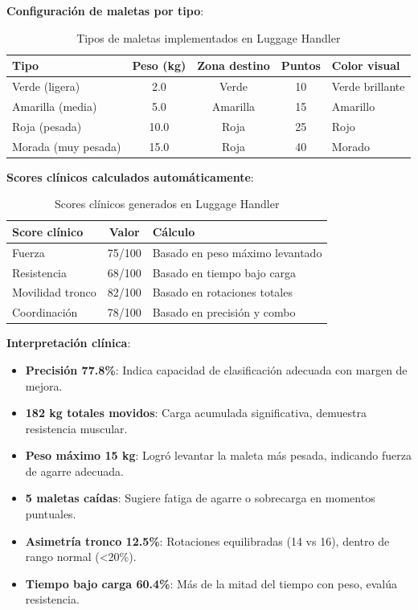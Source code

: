 \textbf{Configuración de maletas por tipo}:

\begin{table}[h]
\centering
\begin{tabular}{|l|c|c|c|l|}
\hline
\textbf{Tipo} & \textbf{Peso (kg)} & \textbf{Zona destino} & \textbf{Puntos} & \textbf{Color visual} \\ \hline
Verde (ligera) & 2.0 & Verde & 10 & Verde brillante \\ \hline
Amarilla (media) & 5.0 & Amarilla & 15 & Amarillo \\ \hline
Roja (pesada) & 10.0 & Roja & 25 & Rojo \\ \hline
Morada (muy pesada) & 15.0 & Roja & 40 & Morado \\ \hline
\end{tabular}
\caption{Tipos de maletas implementados en Luggage Handler}
\label{tab:luggage-types}
\end{table}

\textbf{Scores clínicos calculados automáticamente}:

\begin{table}[h]
\centering
\begin{tabular}{|l|c|l|}
\hline
\textbf{Score clínico} & \textbf{Valor} & \textbf{Cálculo} \\ \hline
Fuerza & 75/100 & Basado en peso máximo levantado \\ \hline
Resistencia & 68/100 & Basado en tiempo bajo carga \\ \hline
Movilidad tronco & 82/100 & Basado en rotaciones totales \\ \hline
Coordinación & 78/100 & Basado en precisión y combo \\ \hline
\end{tabular}
\caption{Scores clínicos generados en Luggage Handler}
\label{tab:luggage-clinical-scores}
\end{table}

\textbf{Interpretación clínica}:
\begin{itemize}
    \item \textbf{Precisión 77.8\%}: Indica capacidad de clasificación adecuada con margen de mejora.
    \item \textbf{182 kg totales movidos}: Carga acumulada significativa, demuestra resistencia muscular.
    \item \textbf{Peso máximo 15 kg}: Logró levantar la maleta más pesada, indicando fuerza de agarre adecuada.
    \item \textbf{5 maletas caídas}: Sugiere fatiga de agarre o sobrecarga en momentos puntuales.
    \item \textbf{Asimetría tronco 12.5\%}: Rotaciones equilibradas (14 vs 16), dentro de rango normal (<20\%).
    \item \textbf{Tiempo bajo carga 60.4\%}: Más de la mitad del tiempo con peso, evalúa resistencia.
\end{itemize}

